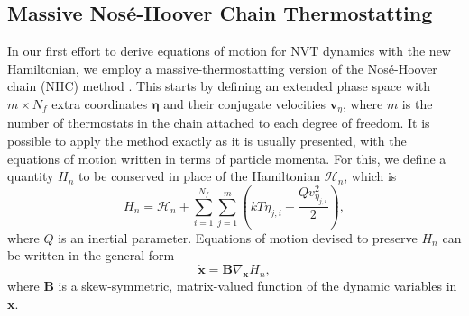 \documentclass[
aip,
jcp,
reprint,
]{revtex4-1}
\newcommand{\mt}[1]{\boldsymbol{\mathbf{#1}}}          %
\newcommand{\vt}[1]{\boldsymbol{\mathbf{#1}}}          %
\newcommand{\tr}[1]{#1^\text{t}}                       %
\newcommand{\diff}[2]{\frac{\partial #2}{\partial #1}} %
\begin{document}
\subsection{Massive Nos\'{e}-Hoover Chain Thermostatting}
\label{sec:massive NHC thermostatting}

In our first effort to derive equations of motion for NVT dynamics with the new Hamiltonian, we employ a massive-thermostatting version of the Nos\'{e}-Hoover chain (NHC) method \cite{Martyna_1992}.
This starts by defining an extended phase space with $m \times N_f$ extra coordinates $\vt \eta$ and their conjugate velocities $\vt v_\eta$, where $m$ is the number of thermostats in the chain attached to each degree of freedom.
It is possible to apply the method exactly as it is usually presented, with the equations of motion written in terms of particle momenta.
For this, we define a quantity $H_n$ to be conserved in place of the Hamiltonian $\mathcal{H}_n$, which is
\begin{equation*}
H_n = {\mathcal H}_n + \sum_{i=1}^{N_f} \sum_{j=1}^m \left(k T \eta_{j, i} + \frac{Q v_{\eta_{j, i}}^2}{2} \right),
\end{equation*}
where $Q$ is an inertial parameter.
Equations of motion devised to preserve $H_n$ can be written in the general form \cite{Sergi_2001}
\begin{equation*}
\dot{\vt x} = {\mt B} \nabla_{\vt x}{H_n},
\end{equation*}
where $\mt B$ is a skew-symmetric, matrix-valued function of the dynamic variables in $\vt x$.
\end{document}
